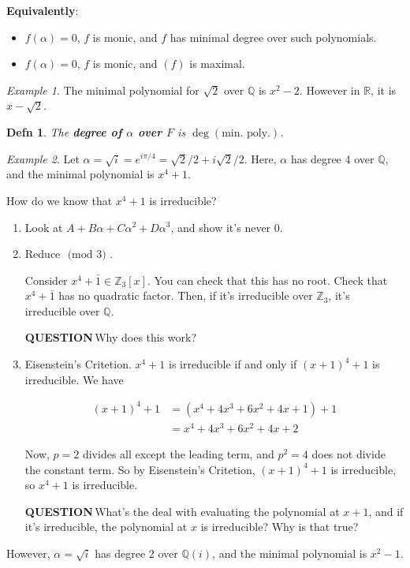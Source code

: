 \documentclass[12pt]{article}
\def\Z{{\mathbb Z}}
\def\Q{{\mathbb Q}}
\def\R{{\mathbb R}}
\def\QUESTION{\color{red}\textbf{QUESTION}\color{black}\,}
\renewcommand{\mod}[1]{\text{ (mod $#1$) }}
\newtheorem{definition}{Defn}
\theoremstyle{remark}
\theoremstyle{remark}
\theoremstyle{remark}
\newtheorem{example}{Example}
\theoremstyle{remark}
\theoremstyle{remark}
\begin{document}
{\bf Equivalently}: 
\begin{itemize}
  \item $f(\alpha) = 0$, $f$ is monic, and $f$ has minimal degree over such polynomials.
  \item $f(\alpha) = 0$, $f$ is monic, and $(f)$ is maximal.
\end{itemize}

\begin{example}
  The minimal polynomial for $\sqrt{2}$ over $\Q$ is $x^2 - 2$. However in $\R$,
  it is $x - \sqrt{2}$.
\end{example}

\begin{definition}
  The {\bf degree of $\alpha$ over $F$} is $\deg(\text{min. poly.})$.
\end{definition}

\begin{example}
  Let $\alpha = \sqrt{i} = e^{i \pi / 4} = \sqrt{2} / 2 + i \sqrt{2} / 2$. Here,
  $\alpha$ has degree $4$ over $\Q$, and the minimal polynomial is $x^4 + 1$.

  How do we know that $x^4 + 1$ is irreducible?
  \begin{enumerate}
    \item Look at $A + B \alpha + C \alpha^2 + D \alpha^3$, and show it's never
      $0$.
    \item Reduce $\mod 3$.

      Consider $x^4 + \bar 1 \in \Z_3[x]$. You can check that this has no root.
      Check that $x^4 + \bar 1$ has no quadratic factor. Then, if it's
      irreducible over $\Z_3$, it's irreducible over $\Q$.

      \QUESTION Why does this work?

    \item Eisenstein's Critetion. $x^4 + 1$ is irreducible if and only if $(x +
      1)^4 + 1$ is irreducible. We have

      \begin{align*}
        (x + 1)^4 + 1 &= (x^4 + 4x^3 + 6x^2 + 4x + 1) + 1 \\
                      &= x^4 + 4x^3 + 6x^2 + 4x + 2
      \end{align*}

      Now, $p = 2$ divides all except the leading term, and $p^2 = 4$ does not
      divide the constant term. So by Eisenstein's Critetion, $(x + 1)^4 + 1$ is
      irreducible, so $x^4 + 1$ is irreducible.

      \QUESTION What's the deal with evaluating the polynomial at $x + 1$, and
      if it's irreducible, the polynomial at $x$ is irreducible? Why is that
      true?
  \end{enumerate}

  However, $\alpha = \sqrt{i}$ has degree $2$ over $\Q(i)$, and the minimal
  polynomial is $x^2 - 1$.
\end{example}
\end{document}
